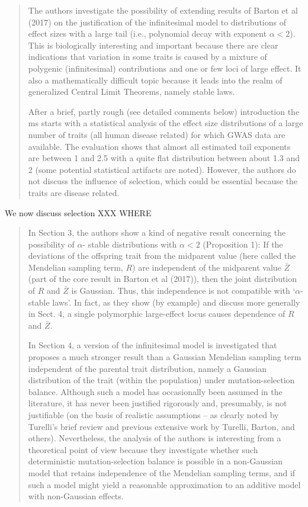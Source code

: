 \begin{quote}
The authors investigate the possibility of extending results of Barton et al (2017) on the
justification of the infinitesimal model to distributions of effect sizes with a large tail (i.e.,
polynomial decay with exponent $\alpha < 2$). This is biologically interesting and important
because there are clear indications that variation in some traits is caused by a mixture
of polygenic (infinitesimal) contributions and one or few loci of large effect. It also a
mathematically difficult topic because it leads into the realm of generalized Central Limit
Theorems, namely stable laws.

After a brief, partly rough (see detailed comments below) introduction the ms starts with
a statistical analysis of the effect size distributions of a large number of traits (all human
disease related) for which GWAS data are available. The evaluation shows that almost
all estimated tail exponents are between 1 and 2.5 with a quite flat distribution between
about 1.3 and 2 (some potential statistical artifacts are noted). However, the authors do
not discuss the influence of selection, which could be essential because the traits are disease
related.
\end{quote}

We now discuss selection XXX WHERE

\begin{quote}
In Section 3, the authors show a kind of negative result concerning the possibility of $\alpha$-
stable distributions with $\alpha < 2$ (Proposition 1): If the deviations of the offspring trait
from the midparent value (here called the Mendelian sampling term, $R$) are independent
of the midparent value $\bar Z$ (part of the core result in Barton et al (2017)), then the joint
distribution of $R$ and $\bar Z$ is Gaussian. Thus, this independence is not compatible with ‘$\alpha$-
stable laws’. In fact, as they show (by example) and discuss more generally in Sect. 4, a
single polymorphic large-effect locus causes dependence of $R$ and $\bar Z$.

In Section 4, a version of the infinitesimal model is investigated that proposes a much
stronger result than a Gaussian Mendelian sampling term independent of the parental
trait distribution, namely a Gaussian distribution of the trait (within the population)
under mutation-selection balance. Although such a model has occasionally been assumed
in the literature, it has never been justified rigorously and, presumably, is not justifiable
(on the basis of realistic assumptions – as clearly noted by Turelli’s brief review and
previous extensive work by Turelli, Barton, and others). Nevertheless, the analysis of the
authors is interesting from a theoretical point of view because they investigate whether
such deterministic mutation-selection balance is possible in a non-Gaussian model that
retains independence of the Mendelian sampling terms, and if such a model might yield a
reasonable approximation to an additive model with non-Gaussian effects.
\end{quote}

